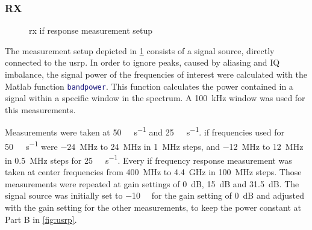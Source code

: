 \documentclass[12pt,a4paper,parskip=full,abstracton]{scrartcl}
\begin{document}
\subsubsection{RX}
\label{sec:ifrx}
\begin{figure}[htb]
    \centering
    \caption{\gls{rx} \gls{if} response measurement setup}
    \label{fig:rxifsetup}
\end{figure}

The measurement setup depicted in \cref{fig:rxifsetup} consists of a signal source, directly
connected to the \gls{usrp}. In order to ignore peaks, caused by aliasing and IQ imbalance,
the signal power of the frequencies of interest were calculated with the Matlab function
\lstinline[language=matlab]{bandpower}. This function calculates the power contained in
a signal within a specific window in the spectrum. A \SI{100}{\kilo\hertz} window was
used for this measurements.

Measurements were taken at \SI{50}{\mega\samples\per\second} and \SI{25}{\mega\samples\per\second}.
\gls{if} frequencies used for \SI{50}{\mega\samples\per\second} were \SI{-24}{\mega\hertz}
to \SI{+24}{\mega\hertz} in \SI{1}{\mega\hertz} steps, and \SI{-12}{\mega\hertz}
to \SI{+12}{\mega\hertz} in \SI{0.5}{\mega\hertz} steps for \SI{25}{\mega\samples\per\second}.
Every \gls{if} frequency response measurement was taken at center frequencies from \SI{400}{\mega\hertz}
to \SI{4.4}{\giga\hertz} in \SI{100}{\mega\hertz} steps. Those measurements were repeated
at gain settings of \SI{0}{\deci\bel}, \SI{15}{\deci\bel} and \SI{31.5}{\deci\bel}. The signal source was
initially set to \SI{-10}{\deci\belm} for the gain setting of \SI{0}{\deci\bel} and adjusted with the
gain setting for the other measurements, to keep the power constant at Part B in \cref{fig:usrp}.
\end{document}
